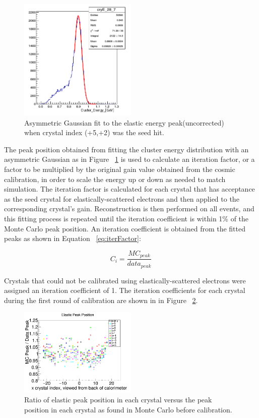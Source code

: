 \documentclass[twoside]{article}
\begin{document}
\begin{multicols}{2}
\begin{figure}[H]
  \centering
      \includegraphics[width=0.5\textwidth]{pics/indifvidualfeefit.png}
  \caption{Asymmetric Gaussian fit to the elastic energy peak(uncorrected) when crystal index (+5,+2) was the seed hit.}
  \label{feeExample}
\end{figure} 	
	
The peak position obtained from fitting the cluster energy distribution with an asymmetric Gaussian as in Figure ~\ref{feeExample} is used to calculate an iteration factor, or a factor to be multiplied by the original gain value obtained from the cosmic calibration, in order to scale the energy up or down as needed to match simulation. The iteration factor is calculated for each crystal that has acceptance as the seed crystal for elastically-scattered electrons and then applied to the corresponding crystal's gain. Reconstruction is then performed on all events, and this fitting process is repeated until the iteration coefficient is within 1\% of the Monte Carlo peak position. An iteration coefficient is obtained from the fitted peaks as shown in Equation ~\eqref{eq:iterFactor}:
	
\begin{equation}
\label{eq:iterFactor}
C_i = \dfrac{MC_{peak}}{data_{peak}}
\end{equation}	
	
	Crystals that could not be calibrated using elastically-scattered electrons were assigned an iteration coefficient of 1. The iteration coefficients for each crystal during the first round of calibration are shown in in Figure ~\ref{feeiter1}. 	
	
\begin{figure}[H]
  \centering
      \includegraphics[width=0.5\textwidth]{pics/feeiter2.png}
  \caption{Ratio of elastic peak position in each crystal versus the peak position in each crystal as found in Monte Carlo before calibration.}
  \label{feeiter1}
\end{figure}	


\end{multicols}
\end{document}
